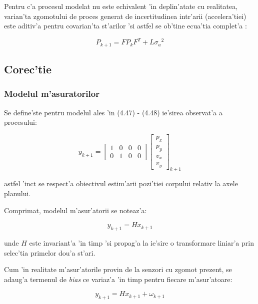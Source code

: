 \documentclass[12pt,a4paper,twoside]{report}
\begin{document}
Pentru c'a procesul modelat nu este echivalent 'in deplin'atate cu realitatea, varian'ta zgomotului de proces generat de incertitudinea intr'arii (accelera'tiei) este aditiv'a pentru covarian'ta st'arilor 'si astfel se ob'tine ecua'tia complet'a \cite{10.1115/1.3662552}:

\begin{equation}
    P_{k+1} = F P_k F^T + L {\sigma_a}^2
\end{equation}


\subsection{Corec'tie}

\subsubsection{Modelul m'asuratorilor}

Se define'ste pentru modelul ales 'in (4.47) - (4.48) ie'sirea observat'a a procesului:

\begin{equation}
    y_{k+1} = \begin{bmatrix}
1 & 0 & 0 & 0 \\ 0 & 1 & 0 & 0 \end{bmatrix} \begin{bmatrix} p_x \\ p_y \\ v_x \\ v_y \end{bmatrix}_{k+1}
\end{equation}

astfel 'inc\ia t se respect'a obiectivul estim'arii pozi'tiei corpului relativ la axele planului.

Comprimat, modelul m'asur'atorii se noteaz'a:

\begin{equation}
    y_{k+1} = H x_{k+1}
\end{equation}

unde $H$ este invariant'a 'in timp 'si propag'a la ie'sire o transformare liniar'a prin selec'tia primelor dou'a st'ari.

Cum 'in realitate m'asur'atorile provin de la senzori cu zgomot prezent, se adaug'a termenul de \textit{bias} ce variaz'a 'in timp pentru fiecare m'asur'atoare:

\begin{equation}
    y_{k+1} = H x_{k+1} + \omega_{k+1}
\end{equation}
\end{document}
